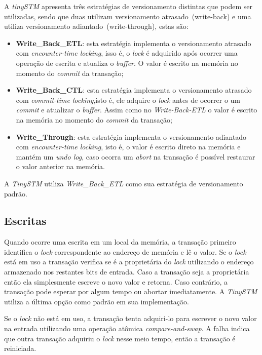 \documentclass[diss,capa]{texufpel}
\begin{document}
A \emph{tinySTM} apresenta três estratégias de versionamento distintas que podem ser utilizadas, sendo que duas utilizam versionamento atrasado~(write-back) e uma utiliza versionamento adiantado~(write-through), estas são:

\begin{itemize}
 \item \textbf{Write\_Back\_ETL}: esta estratégia implementa o versionamento atrasado com \emph{encounter-time locking}, isso é, o \emph{lock} é adquirido após ocorrer uma operação de escrita e atualiza o \emph{buffer}. O valor é escrito na memória no momento do \emph{commit} da transação;

 \item \textbf{Write\_Back\_CTL}: esta estratégia implementa o versionamento atrasado com \emph{commit-time locking},isto é, ele adquire o \emph{lock} antes de ocorrer o um \emph{commit} e atualizar o \emph{buffer}. Assim como no \emph{Write-Back-ETL} o valor é escrito na memória no momento do \emph{commit} da transação;

 \item \textbf{Write\_Through}: esta estratégia implementa o versionamento adiantado com \emph{encounter-time locking}, isto é, o valor é escrito direto na memória e mantém um \emph{undo log}, caso ocorra um \emph{abort} na transação é possível restaurar o valor anterior na memória.
\end{itemize}

A \emph{TinySTM} utiliza \emph{Write\_Back\_ETL} como sua estratégia de versionamento padrão.

\subsection{Escritas}

Quando ocorre uma escrita em um local da memória, a transação primeiro identifica o \emph{lock} correspondente ao endereço de memória e lê o valor. Se o \emph{lock} está em uso a transação verifica se é a proprietária do \emph{lock} utilizando o endereço armazenado nos restantes bits de entrada. Caso a transação seja a proprietária então ela simplesmente escreve o novo valor e retorna. Caso contrário, a transação pode esperar por algum tempo ou abortar imediatamente. A \emph{TinySTM} utiliza a última opção como padrão em sua implementação.

Se o \emph{lock} não está em uso, a transação tenta adquiri-lo para escrever o novo valor na entrada utilizando uma operação atômica \emph{compare-and-swap}. A falha indica que outra transação adquiriu o \emph{lock} nesse meio tempo, então a transação é reiniciada.
\end{document}
